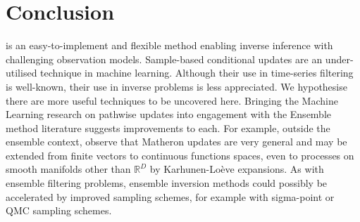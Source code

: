 \documentclass{article}
\theoremstyle{plain}
\theoremstyle{definition}
\theoremstyle{remark}
\begin{document}
\section{Conclusion}

\meth{} is an easy-to-implement and flexible method enabling inverse inference with challenging observation models.
Sample-based conditional updates are an under-utilised technique in machine learning.
Although their use in time-series filtering is well-known, their use in inverse problems is less appreciated.
We hypothesise there are more useful techniques to be uncovered here.
Bringing the Machine Learning research on pathwise updates into engagement with the Ensemble method literature suggests improvements to each.
For example, outside the ensemble context, \citet{WilsonPathwise2021} observe that Matheron updates are very general and may be extended from finite vectors to continuous functions spaces, even to processes on smooth manifolds other than \(\mathbb{R}^{D}\) by Karhunen-Lo\`eve expansions.
As with ensemble  filtering problems, ensemble inversion methods could possibly be accelerated by improved sampling schemes, for example with sigma-point or QMC sampling schemes.


\clearpage




\appendix
\onecolumn
\end{document}
